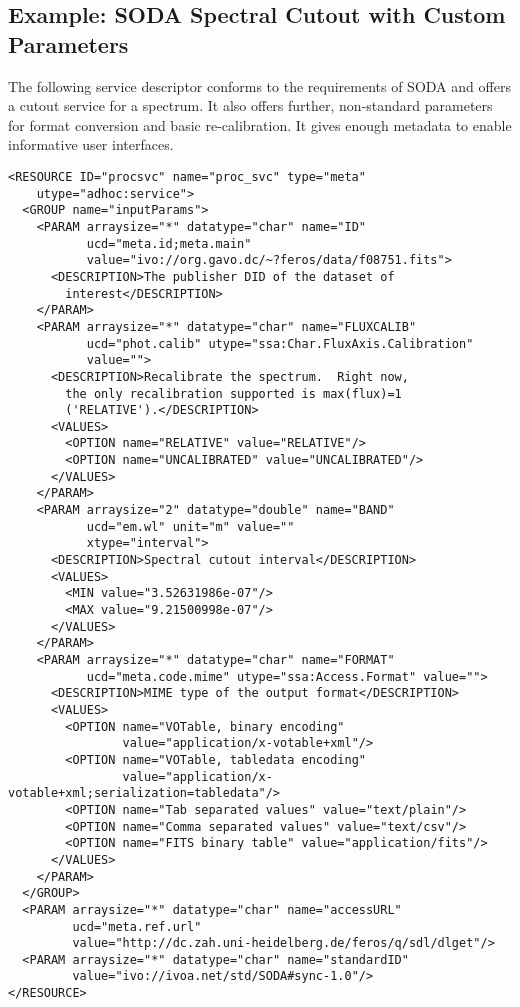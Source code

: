 \documentclass[11pt,a4paper]{ivoa}
\begin{document}
\subsection{Example: SODA Spectral Cutout with Custom Parameters}

The following service descriptor conforms to the requirements of SODA
\citep{2017ivoa.spec.0517B} and offers a cutout service for a spectrum.
It also offers further, non-standard parameters for format conversion
and basic re-calibration.  It gives enough metadata to enable
informative user interfaces.

{\small
\begin{verbatim}
<RESOURCE ID="procsvc" name="proc_svc" type="meta"
    utype="adhoc:service">
  <GROUP name="inputParams">
    <PARAM arraysize="*" datatype="char" name="ID"
           ucd="meta.id;meta.main"
           value="ivo://org.gavo.dc/~?feros/data/f08751.fits">
      <DESCRIPTION>The publisher DID of the dataset of
        interest</DESCRIPTION>
    </PARAM>
    <PARAM arraysize="*" datatype="char" name="FLUXCALIB"
           ucd="phot.calib" utype="ssa:Char.FluxAxis.Calibration"
           value="">
      <DESCRIPTION>Recalibrate the spectrum.  Right now,
        the only recalibration supported is max(flux)=1
        ('RELATIVE').</DESCRIPTION>
      <VALUES>
        <OPTION name="RELATIVE" value="RELATIVE"/>
        <OPTION name="UNCALIBRATED" value="UNCALIBRATED"/>
      </VALUES>
    </PARAM>
    <PARAM arraysize="2" datatype="double" name="BAND"
           ucd="em.wl" unit="m" value=""
           xtype="interval">
      <DESCRIPTION>Spectral cutout interval</DESCRIPTION>
      <VALUES>
        <MIN value="3.52631986e-07"/>
        <MAX value="9.21500998e-07"/>
      </VALUES>
    </PARAM>
    <PARAM arraysize="*" datatype="char" name="FORMAT"
           ucd="meta.code.mime" utype="ssa:Access.Format" value="">
      <DESCRIPTION>MIME type of the output format</DESCRIPTION>
      <VALUES>
        <OPTION name="VOTable, binary encoding"
                value="application/x-votable+xml"/>
        <OPTION name="VOTable, tabledata encoding"
                value="application/x-votable+xml;serialization=tabledata"/>
        <OPTION name="Tab separated values" value="text/plain"/>
        <OPTION name="Comma separated values" value="text/csv"/>
        <OPTION name="FITS binary table" value="application/fits"/>
      </VALUES>
    </PARAM>
  </GROUP>
  <PARAM arraysize="*" datatype="char" name="accessURL"
         ucd="meta.ref.url"
         value="http://dc.zah.uni-heidelberg.de/feros/q/sdl/dlget"/>
  <PARAM arraysize="*" datatype="char" name="standardID"
         value="ivo://ivoa.net/std/SODA#sync-1.0"/>
</RESOURCE>
\end{verbatim}
}
\end{document}
